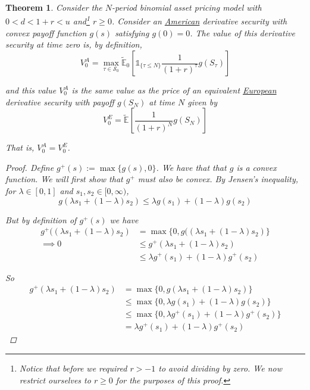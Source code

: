\documentclass[12pt]{article}
\newtheorem{theorem}{Theorem}
\newcommand{\E}{\mathbb E}
\begin{document}
\begin{theorem} Consider the $N$-period binomial asset pricing model with $0 < d < 1 + r  < u$ and\footnote{Notice that before we required $r > -1$ to avoid dividing by zero. We now restrict ourselves to $r \geq 0$ for the purposes of this proof.} $r \geq 0$. Consider an \underline{American} derivative security with convex payoff function $g(s)$ satisfying $g(0) = 0$. The value of this derivative security at time zero is, by definition,
\begin{equation*}
	V^A_0 = \max_{\tau \in \mathcal S_0} \tilde{\E}_0 \left[ \mathds 1_{\{\tau \leq N\}} \frac{1}{(1 + r)^\tau} g(S_\tau) \right]
\end{equation*}

and this value $V^A_0$ is the same value as the price of an equivalent \underline{European} derivative security with payoff $g(S_N)$ at time $N$ given by
\begin{equation*}
	V^E_0 = \tilde{\E} \left[ \frac{1}{(1 + r)^N} g(S_N) \right]
\end{equation*}

That is, $V^A_0 = V^E_0$.

\begin{proof} Define $g^+(s) := \max \{g(s), 0\}$. We have that that $g$ is a convex function. We will first show that $g^+$ must also be convex. By Jensen's inequality, for $\lambda \in [0,1]$ and $s_1, s_2 \in [0, \infty)$,
\begin{equation*}
	g(\lambda s_1 + (1 - \lambda)s_2) \leq \lambda g(s_1) + (1 - \lambda)g(s_2)
\end{equation*}

But by definition of $g^+(s)$ we have
\begin{align*}
	g^+((\lambda s_1 + (1 - \lambda)s_2) &= \max \Big\{0, g((\lambda s_1 + (1 - \lambda)s_2) \Big\} \\
	\implies 0 &\leq g^+(\lambda s_1 + (1 - \lambda)s_2) \\
	&\leq \lambda g^+(s_1) + (1 - \lambda)g^+(s_2)
\end{align*}

So
\begin{align*}
	g^+(\lambda s_1 + (1 - \lambda)s_2) &= \max \big\{0, g(\lambda s_1 + (1 - \lambda)s_2) \big\} \\
	&\leq \max \Big\{0, \lambda g(s_1) + (1 - \lambda)g(s_2) \Big\} \\
	&\leq \max \Big\{0, \lambda g^+(s_1) + (1 - \lambda)g^+(s_2) \Big\} \\
	&= \lambda g^+(s_1) + (1 - \lambda)g^+(s_2)
\end{align*}


\end{proof}
\end{theorem}
\end{document}
